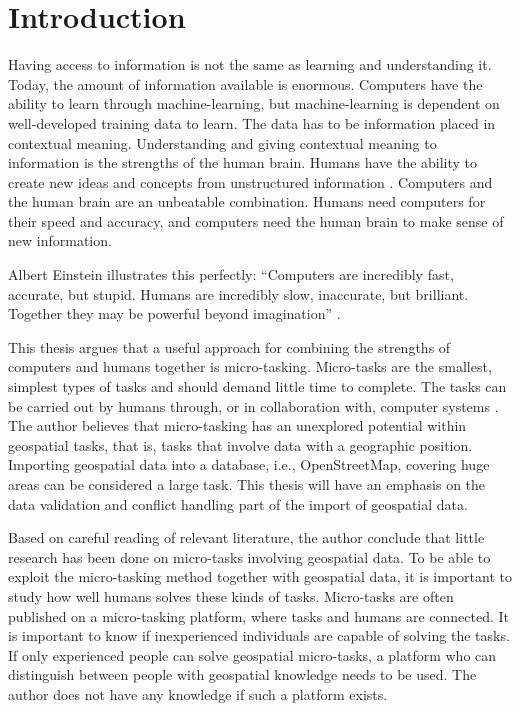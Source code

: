 \chapter{Introduction}
Having access to information is not the same as learning and understanding it. Today, the amount of information available is enormous. Computers have the ability to learn through machine-learning, but machine-learning is dependent on well-developed training data to learn. The data has to be information placed in contextual meaning. Understanding and giving contextual meaning to information is the strengths of the human brain. Humans have the ability to create new ideas and concepts from unstructured information \citep{Ross2016}. Computers and the human brain are an unbeatable combination. Humans need computers for their speed and accuracy, and computers need the human brain to make sense of new information. 

Albert Einstein illustrates this perfectly: “Computers are incredibly fast, accurate, but stupid. Humans are incredibly slow, inaccurate, but brilliant. Together they may be powerful beyond imagination” \citep{Holzinger2013}. 

This thesis argues that a useful approach for combining the strengths of computers and humans together is micro-tasking. Micro-tasks are the smallest, simplest types of tasks and should demand little time to complete. The tasks can be carried out by humans through, or in collaboration with, computer systems \citep{Yang2016}. The author believes that micro-tasking has an unexplored potential within geospatial tasks, that is, tasks that involve data with a geographic position. %
Importing geospatial data into a database, i.e., OpenStreetMap, covering huge areas can be considered a large task. This thesis will have an emphasis on the data validation and conflict handling part of the import of geospatial data.

Based on careful reading of relevant literature, the author conclude that little research has been done on micro-tasks involving geospatial data. To be able to exploit the micro-tasking method together with geospatial data, it is important to study how well humans solves these kinds of tasks. Micro-tasks are often published on a micro-tasking platform, where tasks and humans are connected. It is important to know if inexperienced individuals are capable of solving the tasks. If only experienced people can solve geospatial micro-tasks, a platform who can distinguish between people with geospatial knowledge needs to be used. The author does not have any knowledge if such a platform exists. 

